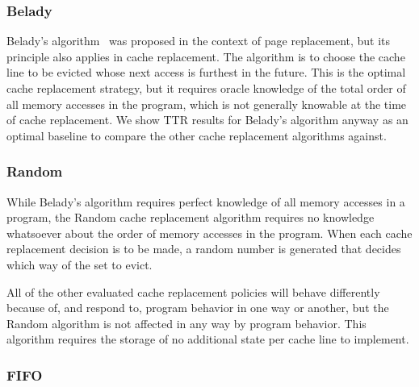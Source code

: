 \subsubsection{Belady}

Belady's algorithm~\cite{belady66} was proposed in the context of page replacement, but its principle also applies in cache replacement.  The algorithm is to choose the cache line to be evicted whose next access is furthest in the future.  This is the optimal cache replacement strategy, but it requires oracle knowledge of the total order of all memory accesses in the program, which is not generally knowable at the time of cache replacement.  We show TTR results for Belady's algorithm anyway as an optimal baseline to compare the other cache replacement algorithms against.

\subsubsection{Random}

While Belady's algorithm requires perfect knowledge of all memory accesses in a program, the Random cache replacement algorithm requires no knowledge whatsoever about the order of memory accesses in the program.  When each cache replacement decision is to be made, a random number is generated that decides which way of the set to evict.

All of the other evaluated cache replacement policies will behave differently because of, and respond to, program behavior in one way or another, but the Random algorithm is not affected in any way by program behavior.  This algorithm requires the storage of no additional state per cache line to implement.

\subsubsection{FIFO}

